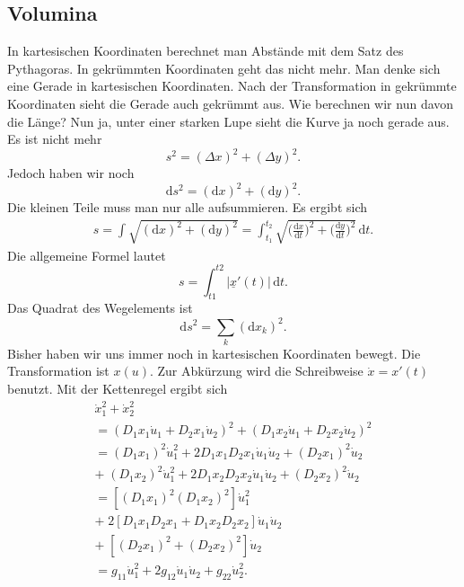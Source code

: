 \documentclass[a4paper,11pt,fleqn,twocolumn,twoside]{scrartcl}
\numberwithin{equation}{section}
\begin{document}
\subsection{Volumina}

In kartesischen Koordinaten berechnet man Abstände mit dem Satz des
Pythagoras. In gekrümmten Koordinaten geht das nicht mehr. Man denke
sich eine Gerade in kartesischen Koordinaten. Nach der Transformation
in gekrümmte Koordinaten sieht die Gerade auch gekrümmt aus. Wie
berechnen wir nun davon die Länge? Nun ja, unter einer starken Lupe
sieht die Kurve ja noch gerade aus. Es ist nicht mehr
\begin{equation}
s^2 = (\Delta x)^2+(\Delta y)^2.
\end{equation}
Jedoch haben wir noch
\begin{equation}
\mathrm ds^2 = (\mathrm dx)^2+(\mathrm dy)^2.
\end{equation}
Die kleinen Teile muss man nur alle aufsummieren. Es ergibt sich
\begin{gather*}
s = \int \sqrt{(\mathrm dx)^2+(\mathrm dy)^2}
= \int_{t_1}^{t_2}\sqrt{\Big(\frac{\mathrm dx}{\mathrm dt}\Big)^2
+\Big(\frac{\mathrm dy}{\mathrm dt}\Big)^2}\,\mathrm dt.
\end{gather*}
Die allgemeine Formel lautet
\begin{equation}
s = \int_{t1}^{t2} |\underline x'(t)|\,\mathrm dt.
\end{equation}
Das Quadrat des Wegelements ist
\begin{equation}
\mathrm ds^2 = \sum_k (\mathrm dx_k)^2.
\end{equation}
Bisher haben wir uns immer noch in kartesischen Koordinaten bewegt.
Die Transformation ist $x(u)$. Zur Abkürzung wird die Schreibweise
$\dot x=x'(t)$ benutzt. Mit der Kettenregel ergibt sich
\begin{gather*}
\dot x_1^2+\dot x_2^2\\
= (D_1x_1\dot u_1+D_2x_1\dot u_2)^2
+ (D_1x_2\dot u_1+D_2x_2\dot u_2)^2\\
= (D_1x_1)^2\dot u_1^2+2D_1x_1D_2x_1\dot u_1\dot u_2
+ (D_2x_1)^2\dot u_2\\
+\; (D_1x_2)^2\dot u_1^2+2D_1x_2D_2x_2\dot u_1\dot u_2
+ (D_2x_2)^2\dot u_2\\
= [(D_1x_1)^2(D_1x_2)^2]\dot u_1^2\\
+\; 2[D_1x_1D_2x_1+D_1x_2D_2x_2]\dot u_1\dot u_2\\
+\; [(D_2x_1)^2+(D_2x_2)^2]\dot u_2\\
= g_{11}\dot u_1^2+2g_{12}\dot u_1\dot u_2+g_{22}\dot u_2^2.
\end{gather*}
\end{document}
